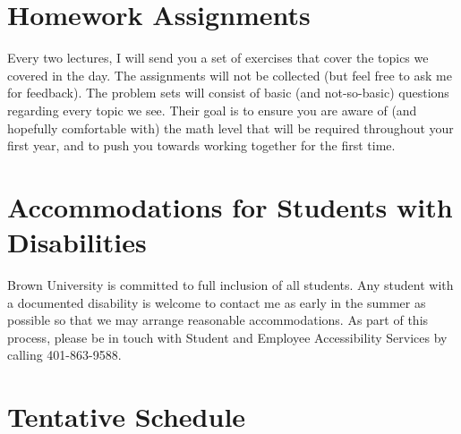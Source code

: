 \documentclass[11pt]{article}
\begin{document}
\section{Homework Assignments}
\label{sec:homework_assignments}

Every two lectures, I will send you a set of exercises that cover the topics we covered in the day. The assignments will not be collected (but feel free to ask me for feedback). The problem sets will consist of basic (and not-so-basic) questions regarding every topic we see. Their goal is to ensure you are aware of (and hopefully comfortable with) the math level that will be required throughout your first year, and to push you towards working together for the first time.

\section{Accommodations for Students with Disabilities}
\label{sec:accommodations_for_students_with_disabilities}

Brown University is committed to full inclusion of all students. Any student with a documented disability is welcome to contact me as early in the summer as possible so that we may arrange reasonable accommodations. As part of this process, please be in touch with Student and Employee Accessibility Services by calling 401-863-9588.

\section{Tentative Schedule}
\label{sec:tentative_schedule}
\end{document}
